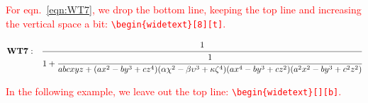 \begin{table}[b]
\caption{Table at full column width with columns in math mode}\label{tab:3}
\end{table}

\lipsum[40-48]

\textcolor{red}{For eqn.~\eqref{eqn:WT7}, we drop the bottom line, keeping the top line and increasing the vertical space a bit: \texttt{\textbackslash begin\{widetext\}[8][t]}.}

\begin{widetext}[8][t]
\begin{equation}\label{eqn:WT7}
\mathbf{WT7:}\quad
\cfrac{1}{1+ \cfrac{1}{abcxyz+(ax^2-by^3+cz^4)(\alpha\chi^2-\beta\upsilon^3+\kappa\zeta^4)(ax^4-by^3+cz^2)(a^2x^2-by^3+c^2z^2)}}
\end{equation}
\end{widetext}

\lipsum[50-60]

\textcolor{red}{In the following example, we leave out the top line: \texttt{\textbackslash begin\{widetext\}[][b]}.}

\vskip 80pt%

